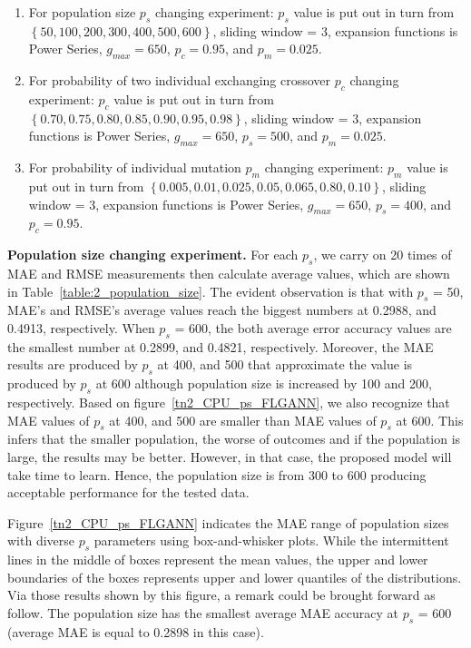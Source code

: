 \documentclass[conference]{IEEEtran}
\begin{document}
\begin{enumerate}
	\item For population size $p_s$ changing experiment: $p_s$ value is put out in turn from $\left\{50, 100, 200, 300, 400, 500, 600\right\}$, sliding window = 3, expansion functions is Power Series, $g_{max} = 650$,  $p_c = 0.95$, and $p_m = 0.025$.	
	\item For probability of two individual exchanging crossover $p_c$ changing experiment: $p_c$ value is put out in turn from $\left\{ 0.70, 0.75, 0.80, 0.85, 0.90, 0.95, 0.98 \right\}$, sliding window = 3, expansion functions is Power Series, $g_{max} = 650$, $p_s = 500$, and $p_m = 0.025$.
	\item For probability of individual mutation $p_m$ changing experiment: $p_m$ value is put out in turn from $\left\{ 0.005, 0.01, 0.025, 0.05, 0.065, 0.80, 0.10 \right\}$, sliding window = 3, expansion functions is Power Series, $g_{max} = 650$, $p_s = 400$, and $p_c = 0.95$.
\end{enumerate}

\textbf{Population size changing experiment.} For each $p_s$, we carry on 20 times of MAE and RMSE measurements then calculate average values, which are shown in Table~\ref{table:2_population_size}. The evident observation is that with $p_s$ = 50, MAE's and RMSE's average values reach the biggest numbers at 0.2988, and 0.4913, respectively. When $p_s$ = 600, the both average error accuracy values are the smallest number at 0.2899, and 0.4821, respectively. Moreover, the MAE results are produced by $p_s$ at 400, and 500 that approximate the value is produced by $p_s$ at 600 although population size is increased by 100 and 200, respectively. Based on figure~\ref{tn2_CPU_ps_FLGANN}, we also recognize that MAE values of $p_s$ at 400, and 500 are smaller than MAE values of $p_s$ at 600. This infers that the smaller population, the worse of outcomes and if the population is large, the results may be better. However, in that case, the proposed model will take time to learn. Hence, the population size is from 300 to 600 producing acceptable performance for the tested data.

Figure~\ref{tn2_CPU_ps_FLGANN} indicates the MAE range of population sizes with diverse $p_s$ parameters using box-and-whisker plots. While the intermittent lines in the middle of boxes represent the mean values, the upper and lower boundaries of the boxes represents upper and lower quantiles of the distributions. Via those results shown by this figure, a remark could be brought forward as follow. The population size has the smallest average MAE accuracy at $p_s$ = 600 (average MAE is equal to 0.2898 in this case).
\end{document}
